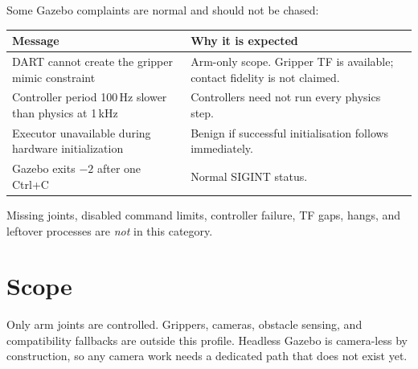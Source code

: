 Some Gazebo complaints are normal and should not be chased:

\begin{table}[h]
\centering
\small
\begin{tabularx}{\linewidth}{@{}lX@{}}
\toprule
\textbf{Message} & \textbf{Why it is expected} \\
\midrule
DART cannot create the gripper mimic constraint & Arm-only scope. Gripper TF is available; contact fidelity is not claimed. \\
Controller period 100\,Hz slower than physics at 1\,kHz & Controllers need not run every physics step. \\
Executor unavailable during hardware initialization & Benign if successful initialisation follows immediately. \\
Gazebo exits $-2$ after one Ctrl+C & Normal SIGINT status. \\
\bottomrule
\end{tabularx}
\end{table}

Missing joints, disabled command limits, controller failure, TF gaps, hangs, and
leftover processes are \emph{not} in this category.

\section{Scope}

Only arm joints are controlled. Grippers, cameras, obstacle sensing, and
compatibility fallbacks are outside this profile. Headless Gazebo is camera-less
by construction, so any camera work needs a dedicated path that does not exist
yet.
